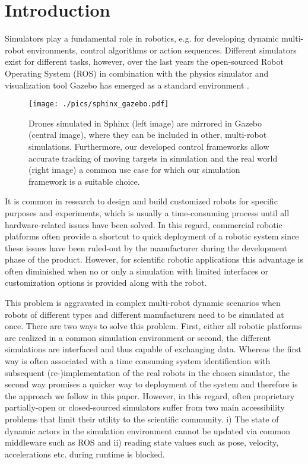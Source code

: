 \section{Introduction}\label{sec:Introduction}
Simulators play a fundamental role in robotics, e.g.  for developing dynamic multi-robot environments, control algorithms or action sequences.
Different simulators exist for different tasks, however, over the last years the open-sourced Robot Operating System (ROS) in combination with the physics simulator and visualization tool Gazebo \cite{quigley09}  has emerged as a standard environment  \cite{sarabakha2023}. \\
\begin{figure}[thpb]
      \centering
		\texttt{[image: ./pics/sphinx\_gazebo.pdf]}
\caption{Drones simulated in Sphinx (left image) are mirrored in Gazebo (central image), where they can be included in other, multi-robot simulations. Furthermore, our developed control frameworks allow accurate tracking of moving targets in simulation and the real world (right image) a common use case for which our simulation framework is a suitable choice.}
\label{fig:title_image}
 \end{figure}
It is common in research to design and build customized robots for specific purposes and experiments, which is usually a time-consuming process until all hardware-related issues have been solved. In this regard, commercial robotic platforms often provide a shortcut to quick deployment of a robotic system since these issues have been ruled-out by the manufacturer during the development phase of the product.  However, for scientific robotic applications this advantage is often diminished when no or only a simulation with limited interfaces or customization options is provided along with the robot. 

This problem is aggravated in complex multi-robot dynamic scenarios when robots of different types and different manufacturers need to be simulated at once. 
There are two ways to solve this problem.  First, either all robotic platforms are realized in a common simulation environment or second, the different simulations are interfaced and thus capable of exchanging data. Whereas the first way is often associated with a time consuming system identification with subsequent (re-)implementation of the real robots in the chosen simulator, the second way promises a quicker way to deployment of the system and therefore is the approach we follow in this paper. However, in this regard, often proprietary partially-open or closed-sourced simulators  suffer from two main accessibility problems that limit their utility to the scientific community. i) The state of dynamic actors in the simulation environment cannot be updated via common middleware such as ROS and ii) reading state values such as pose, velocity, accelerations etc. during runtime is blocked.



